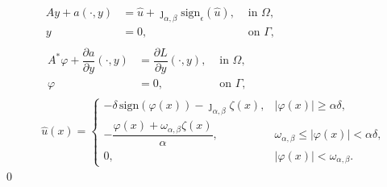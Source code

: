 \documentclass[11pt,a4paper]{amsart}
\newcommand{\ds}{\displaystyle}
\renewcommand{\l}{\left}
\renewcommand{\r}{\right}
\newcommand{\om}{\Omega}
\newcommand{\ga}{\Gamma}
\newcommand{\sign}{\mathrm{sign}}
\begin{document}
\begin{subequations}\label{eq:reg_system}
	\begin{align}
&\begin{array}{rlc}
	A y + a(\cdot, y) & = \hat u + \jmath_{\alpha,\beta}\sign_\epsilon(\hat u), & \text{ in } \om, \\
     y &= 0, & \text{ on } \ga, 
\end{array}\label{eq:optimal_system_P0_a}\\
%
&\,\begin{array}{rlc}
	A^*\varphi + \dfrac{\partial a}{\partial y}(\cdot, y) & = \dfrac{\partial L}{\partial y}(\cdot, y),& \text{ in } \om, \\
      \varphi &= 0, & \text{ on } \ga ,
\end{array} \label{eq:optimal_system_P0_b}\\
&\hat u(x)=\ds
\begin{cases} 
-\delta\,\sign(\varphi(x))-\jmath_{\alpha,\beta}\zeta(x), &|\varphi(x)|\ge \alpha \delta,\\
-\dfrac{\varphi(x)+\omega_{\alpha,\beta}\zeta(x)}{\alpha},&\omega_{\alpha,\beta}\le |\varphi(x)|<\alpha\delta,\\
0, &|\varphi(x)|<\omega_{\alpha,\beta}.
\end{cases}
\label{eq:optimal_system_P_d}
\end{align}
\end{subequations}	
0

\end{document}
